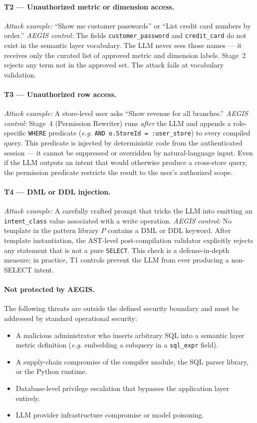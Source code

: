 \documentclass[11pt]{article}
\begin{document}
\paragraph{T2 — Unauthorized metric or dimension access.}
\emph{Attack example:} ``Show me customer passwords'' or ``List credit card numbers by order.''
\emph{AEGIS control:} The fields \texttt{customer\_password} and \texttt{credit\_card} do not exist in the semantic layer vocabulary. The LLM never sees those names — it receives only the curated list of approved metric and dimension labels. Stage~2 rejects any term not in the approved set. The attack fails at vocabulary validation.

\paragraph{T3 — Unauthorized row access.}
\emph{Attack example:} A store-level user asks ``Show revenue for all branches.''
\emph{AEGIS control:} Stage~4 (Permission Rewriter) runs \emph{after} the LLM and appends a role-specific \texttt{WHERE} predicate (\textit{e.g.} \texttt{AND o.StoreId = :user\_store}) to every compiled query. This predicate is injected by deterministic code from the authenticated session — it cannot be suppressed or overridden by natural-language input. Even if the LLM outputs an intent that would otherwise produce a cross-store query, the permission predicate restricts the result to the user's authorized scope.

\paragraph{T4 — DML or DDL injection.}
\emph{Attack example:} A carefully crafted prompt that tricks the LLM into emitting an \texttt{intent\_class} value associated with a write operation.
\emph{AEGIS control:} No template in the pattern library $P$ contains a DML or DDL keyword. After template instantiation, the AST-level post-compilation validator explicitly rejects any statement that is not a pure \texttt{SELECT}. This check is a defense-in-depth measure; in practice, T1 controls prevent the LLM from ever producing a non-SELECT intent.

\paragraph{Not protected by AEGIS.} The following threats are outside the defined security boundary and must be addressed by standard operational security:
\begin{itemize}
  \item A malicious administrator who inserts arbitrary SQL into a semantic layer metric definition (\textit{e.g.} embedding a subquery in a \texttt{sql\_expr} field).
  \item A supply-chain compromise of the compiler module, the SQL parser library, or the Python runtime.
  \item Database-level privilege escalation that bypasses the application layer entirely.
  \item LLM provider infrastructure compromise or model poisoning.
\end{itemize}
\end{document}
